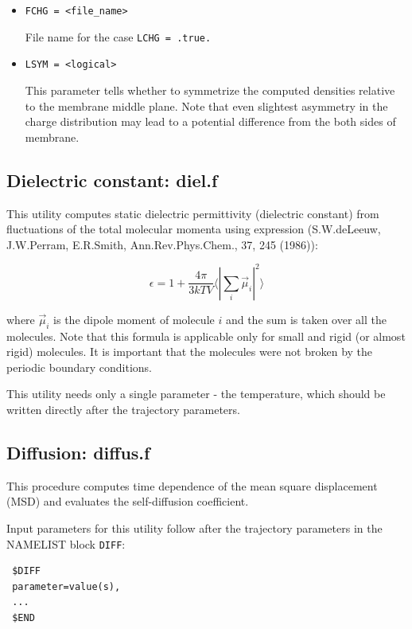 \documentclass{article}
\begin{document}
\begin{itemize}
\item
\verb|FCHG = <file_name>|

File name for the case \verb|LCHG = .true.|

\item
\verb|LSYM = <logical>|

This parameter tells whether to symmetrize the computed densities 
relative to the membrane middle plane. Note that even slightest asymmetry
in the charge distribution may lead to a potential difference from the
both sides of membrane.

\end{itemize}

\subsection{Dielectric constant: diel.f}

This utility computes static dielectric permittivity (dielectric constant)
from fluctuations of the total molecular momenta using expression
(S.W.deLeeuw, J.W.Perram, E.R.Smith, Ann.Rev.Phys.Chem., 37, 245 (1986)):

\begin{equation}
\label{diel}
\epsilon = 1 + \frac{4\pi}{3kTV} \langle | \sum_i \vec{\mu}_i |^2 \rangle
\end{equation}

\noindent
where $\vec{\mu}_i$ is the dipole moment of molecule $i$ and the sum is taken
over all the molecules. Note that this formula is applicable only for small 
and rigid (or almost rigid) molecules. It is important that the molecules were
not broken by the periodic boundary conditions.

This utility needs only a single parameter - the temperature, which
should be written directly after the trajectory parameters.


\subsection{Diffusion: diffus.f}

This procedure computes time dependence of the mean square displacement
(MSD) and evaluates the self-diffusion coefficient.

Input parameters for this utility follow after the trajectory parameters
in the NAMELIST block \verb|DIFF|:

\begin{verbatim}
 $DIFF
 parameter=value(s),
 ...
 $END
\end{verbatim}
\end{document}
